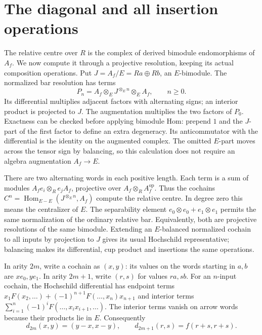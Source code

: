 \section{The diagonal and all insertion operations}

The relative centre over \(R\) is the complex of derived bimodule
endomorphisms of \(A_f\). We now compute it through a projective
resolution, keeping its actual composition operations. Put
\(J=A_f/E=Ra\oplus Rb\), an \(E\)-bimodule. The normalized bar
resolution has terms
\[
 P_n=A_f\otimes_E J^{\otimes_E n}\otimes_E A_f,\qquad n\geq0.
\]
Its differential multiplies adjacent factors with alternating signs;
an interior product is projected to \(J\). The augmentation multiplies
the two factors of \(P_0\). Exactness can be checked before applying
bimodule Hom: prepend \(1\) and the \(J\)-part of the first factor
to define an extra degeneracy. Its anticommutator with the differential
is the identity on the augmented complex. The omitted \(E\)-part
moves across the tensor sign by balancing, so this calculation does
not require an algebra augmentation \(A_f\to E\).

There are two alternating words in each positive length. Each term
is a sum of modules \(A_fe_i\otimes_R e_jA_f\), projective over
\(A_f\otimes_R A_f^{\mathrm{op}}\). Thus the cochains
\(C^n=\operatorname{Hom}_{E-E}(J^{\otimes_E n},A_f)\) compute the
relative centre. In degree zero this means the centralizer of \(E\).
The separability element \(e_0\otimes e_0+e_1\otimes e_1\) permits
the same normalization of the ordinary relative bar. Equivalently,
both are projective resolutions of the same bimodule. Extending an
\(E\)-balanced normalized cochain to all inputs by projection to
\(J\) gives its usual Hochschild representative; balancing makes its
differential, cup product and insertions the same operations.

In arity \(2m\), write a cochain as \((x,y)\): its values on the
words starting in \(a,b\) are \(xe_0,ye_1\). In arity \(2m+1\),
write \((r,s)\) for values \(ra,sb\). For an \(n\)-input cochain,
the Hochschild differential has endpoint terms
\(x_1F(x_2,\ldots)+(-1)^{n+1}F(\ldots,x_n)x_{n+1}\)
and interior terms
\(\sum_{i=1}^n(-1)^iF(\ldots,x_ix_{i+1},\ldots)\).
The interior terms vanish on arrow words because their products lie
in \(E\). Consequently
\begin{equation}\label{eq:fc-periodic}
 d_{2m}(x,y)=(y-x,x-y),\qquad
 d_{2m+1}(r,s)=f(r+s,r+s).
\end{equation}

